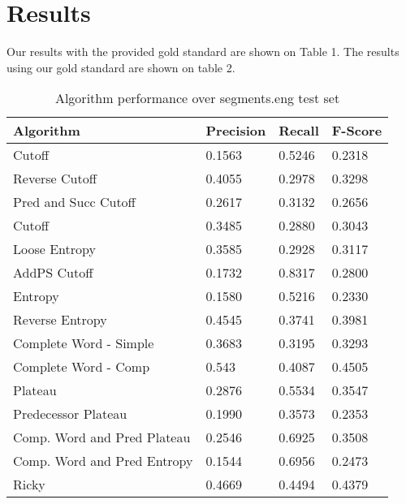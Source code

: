 \documentclass[11pt,letterpaper]{article}
\begin{document}
\section{Results}
  Our results with the provided gold standard are shown on Table 1.  The results using our gold standard are shown on table 2.
  


\begin{table}[b]
\caption{Algorithm performance over segments.eng test set}
\begin{tabular}{l|l|l|l}
Algorithm                      & Precision & Recall & F-Score \\
\hline
Cutoff                         & 0.1563    & 0.5246 & 0.2318  \\
Reverse Cutoff                 & 0.4055    & 0.2978 & 0.3298  \\
Pred and Succ Cutoff		   & 0.2617	   & 0.3132 & 0.2656  \\
Cutoff                   & 0.3485    & 0.2880 & 0.3043  \\
Loose Entropy                  & 0.3585    & 0.2928 & 0.3117  \\
AddPS Cutoff                   & 0.1732    & 0.8317 & 0.2800  \\
Entropy                        & 0.1580    & 0.5216 & 0.2330  \\
Reverse Entropy                & 0.4545    & 0.3741 & 0.3981  \\
Complete Word - Simple         & 0.3683    & 0.3195 & 0.3293  \\
Complete Word - Comp           & 0.543     & 0.4087 & 0.4505  \\
Plateau                        & 0.2876    & 0.5534 & 0.3547  \\
Predecessor Plateau            & 0.1990    & 0.3573 & 0.2353  \\
Comp. Word and Pred Plateau & 0.2546    & 0.6925 & 0.3508  \\
Comp. Word and Pred Entropy & 0.1544    & 0.6956 & 0.2473  \\
Ricky                          & 0.4669    & 0.4494 & 0.4379        
\end{tabular}
\end{table}
    
\end{document}
